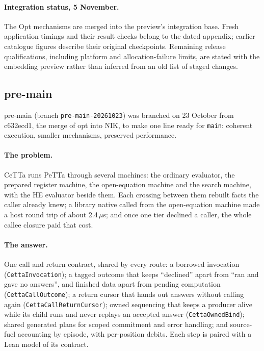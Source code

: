 \documentclass[11pt]{article}
\newcommand{\code}[1]{\texttt{#1}}
\newcommand{\PeTTa}{\textup{PeTTa}}
\newcommand{\HE}{\textup{HE}}
\newcommand{\CeTTa}{\textup{CeTTa}}
\begin{document}
\paragraph{Integration status, 5 November.}  The Opt mechanisms are merged
into the preview's integration base.  Fresh application timings and their
result checks belong to the dated appendix; earlier catalogue figures describe
their original checkpoints.  Remaining release qualifications, including
platform and allocation-failure limits, are stated with the embedding preview
rather than inferred from an old list of staged changes.

\subsection{pre-main}
\label{sec:line-premain}

pre-main (branch \code{pre-main-20261023}) was branched on 23 October from
c632ecd1, the merge of opt into NIK, to make one line ready for \code{main}:
coherent execution, smaller mechanisms, preserved performance.

\paragraph{The problem.}  \CeTTa{} runs \PeTTa{} through several machines:
the ordinary evaluator, the prepared register machine, the open-equation
machine and the search machine, with the \HE{} evaluator beside them.  Each
crossing between them rebuilt facts the caller already knew; a library native
called from the open-equation machine made a host round trip of about
2.4\,$\mu$s; and once one tier declined a caller, the whole callee closure
paid that cost.

\paragraph{The answer.}  One call and return contract, shared by every route:
a borrowed invocation (\code{CettaInvocation}); a tagged outcome that keeps
``declined'' apart from ``ran and gave no answers'', and finished data apart
from pending computation (\code{CettaCallOutcome}); a return cursor that
hands out answers without calling again (\code{CettaCallReturnCursor});
owned sequencing that keeps a producer alive while its child runs and never
replays an accepted answer (\code{CettaOwnedBind}); shared generated plans for
scoped commitment and error handling; and source-fuel accounting by episode,
with per-position debits.  Each step is paired with a Lean model of its
contract.
\end{document}
